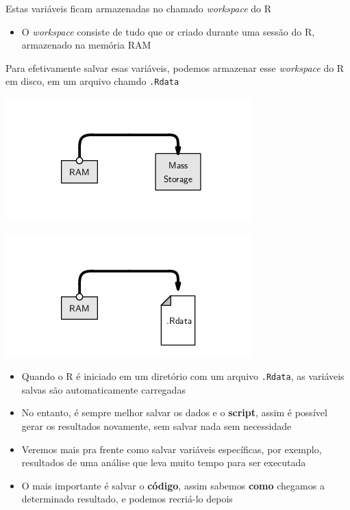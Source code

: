 \documentclass[10pt,a4paper]{book}
\providecommand{\tightlist}{%
  \setlength{\itemsep}{0pt}\setlength{\parskip}{0pt}}
\begin{document}
Estas variáveis ficam armazenadas no chamado \emph{workspace} do R

\begin{itemize}
\tightlist
\item
  O \emph{workspace} consiste de tudo que or criado durante uma sessão
  do R, armazenado na memória RAM
\end{itemize}

Para efetivamente salvar esas variáveis, podemos armazenar esse
\emph{workspace} do R em disco, em um arquivo chamdo \texttt{.Rdata}

\begin{center}\includegraphics[width=0.5\linewidth]{img/script-workspace} \end{center}

\begin{center}\includegraphics[width=0.5\linewidth]{img/script-workspacedata} \end{center}

\begin{itemize}
\tightlist
\item
  Quando o R é iniciado em um diretório com um arquivo \texttt{.Rdata},
  as variáveis salvas são automaticamente carregadas
\item
  No entanto, é sempre melhor salvar os dados e o \textbf{script}, assim
  é possível gerar os resultados novamente, sem salvar nada sem
  necessidade
\item
  Veremos mais pra frente como salvar variáveis específicas, por
  exemplo, resultados de uma análise que leva muito tempo para ser
  executada
\item
  O mais importante é salvar o \textbf{código}, assim sabemos
  \textbf{como} chegamos a determinado resultado, e podemos recriá-lo
  depois
\end{itemize}
\end{document}
